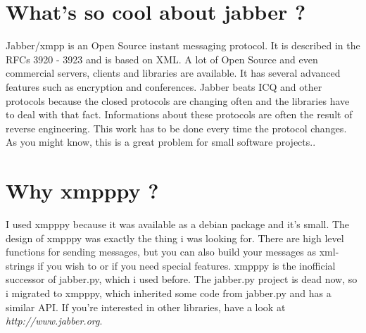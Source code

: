 \documentclass[a4paper,10pt]{report}
\begin{document}
\section{What's so cool about jabber ?}
Jabber/xmpp is an Open Source instant messaging protocol. It is described in the RFCs
3920 - 3923 and is based on XML. A lot of Open Source and even commercial servers, clients and libraries are available.
It has several advanced features such as encryption and conferences.
Jabber beats ICQ and other protocols because the closed protocols are changing often and the libraries have to deal
with that fact. Informations about these protocols are often the result of reverse engineering. This work has to be
done every time the protocol changes. As you might know, this is a great problem for small software projects..
\newline
\\

\section{Why xmpppy ?}


I used xmpppy because it was available as a debian package and it's small. The design of xmpppy was exactly the thing i was looking for. There are high level functions for sending messages, but you can also build your messages as xml-strings if you wish to or if you need special features.
\newline
xmpppy is the inofficial successor of jabber.py, which i used before. The jabber.py project is dead now, so i migrated to xmpppy, which inherited some code from jabber.py and has a similar API.
\newline
If you're interested in other libraries, have a look at \textit{http://www.jabber.org}.
\end{document}
